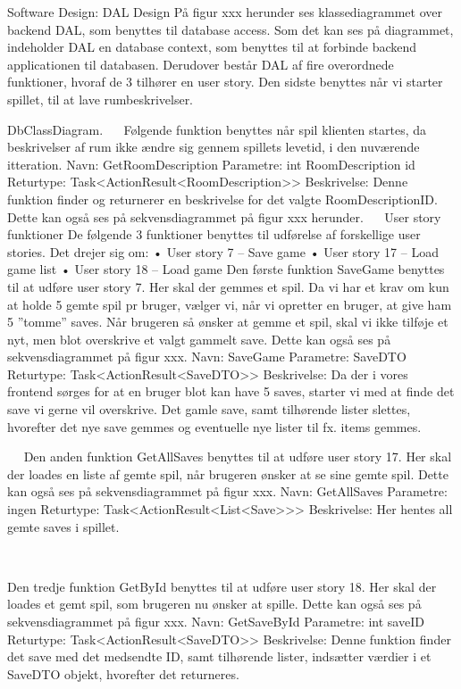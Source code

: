 Software Design:
DAL Design
På figur xxx herunder ses klassediagrammet over backend DAL, som benyttes til database access.
Som det kan ses på diagrammet, indeholder DAL en database context, som benyttes til at forbinde backend applicationen til databasen. Derudover består DAL af fire overordnede funktioner, hvoraf de 3 tilhører en user story. Den sidste benyttes når vi starter spillet, til at lave rumbeskrivelser. 


DbClassDiagram.	
 
Følgende funktion benyttes når spil klienten startes, da beskrivelser af rum ikke ændre sig gennem spillets levetid, i den nuværende itteration.
Navn: GetRoomDescription
Parametre: int RoomDescription id
Returtype: Task<ActionResult<RoomDescription>>
Beskrivelse: Denne funktion finder og returnerer en beskrivelse for det valgte RoomDescriptionID. Dette kan også ses på sekvensdiagrammet på figur xxx herunder.
 
User story funktioner
De følgende 3 funktioner benyttes til udførelse af forskellige user stories.
Det drejer sig om:
•	User story 7 – Save game
•	User story 17 – Load game list
•	User story 18 – Load game
Den første funktion SaveGame benyttes til at udføre user story 7.
Her skal der gemmes et spil. Da vi har et krav om kun at holde 5 gemte spil pr bruger, vælger vi, når vi opretter en bruger, at give ham 5 ”tomme” saves. Når brugeren så ønsker at gemme et spil, skal vi ikke tilføje et nyt, men blot overskrive et valgt gammelt save.
Dette kan også ses på sekvensdiagrammet på figur xxx.
Navn: SaveGame
Parametre: SaveDTO
Returtype: Task<ActionResult<SaveDTO>>
Beskrivelse: Da der i vores frontend sørges for at en bruger blot kan have 5 saves, starter vi med at finde det save vi gerne vil overskrive. Det gamle save, samt tilhørende lister slettes, hvorefter det nye save gemmes og eventuelle nye lister til fx. items gemmes.

 
 


 
Den anden funktion GetAllSaves benyttes til at udføre user story 17.
Her skal der loades en liste af gemte spil, når brugeren ønsker at se sine gemte spil. Dette kan også ses på sekvensdiagrammet på figur xxx.
Navn:  GetAllSaves
Parametre: ingen
Returtype: Task<ActionResult<List<Save>>> 
Beskrivelse: Her hentes all gemte saves i spillet.

  

Den tredje funktion GetById benyttes til at udføre user story 18.
Her skal der loades et gemt spil, som brugeren nu ønsker at spille. 
Dette kan også ses på sekvensdiagrammet på figur xxx.
Navn: GetSaveById 
Parametre: int saveID
Returtype: Task<ActionResult<SaveDTO>>
Beskrivelse: Denne funktion finder det save med det medsendte ID, samt tilhørende lister, indsætter værdier i et SaveDTO objekt, hvorefter det returneres. 

 
 

